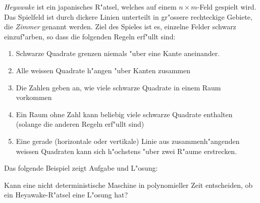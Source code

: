 {\em Heyawake} ist ein japanisches R"atsel, welches auf einem $n\times m$-Feld
gespielt wird. Das Spielfeld ist durch dickere Linien unterteilt in gr"ossere rechteckige Gebiete, die {\it Zimmer} genannt werden. 
Ziel des Spieles ist es, einzelne Felder schwarz einzuf"arben, so dass die
folgenden Regeln erf"ullt sind:
\begin{enumerate}
\item
Schwarze Quadrate grenzen niemals "uber eine Kante aneinander.
\item
Alle weissen Quadrate h"angen "uber Kanten zusammen
\item
Die Zahlen geben an, wie viele schwarze Quadrate in einem Raum vorkommen
\item
Ein Raum ohne Zahl kann beliebig viele schwarze Quadrate enthalten
(solange die anderen Regeln erf"ullt sind)
\item
Eine gerade (horizontale oder vertikale) Linie aus zusammenh"angenden
weissen Quadraten kann sich h"ochstens "uber zwei
R"aume erstrecken.
\end{enumerate}
Das folgende Beispiel zeigt Aufgabe und L"osung:
\begin{center}
\qquad
{}
\end{center}

Kann eine nicht deterministische Maschine in polynomieller Zeit entscheiden,
ob ein Heyawake-R"atsel eine L"osung hat?

